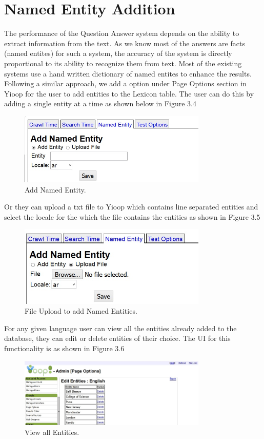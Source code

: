 \section{Named Entity Addition}
The performance of the Question Answer system depends on the ability to extract information from the text. As we know most of the answers are facts (named entites) for such a system, the accuracy of the system is directly proportional to its ability to recognize them from text. Most of the existing systems use a hand written dictionary of named entites to enhance the results. Following a similar approach, we add a option under Page Options section in Yioop for the user to add entities to the Lexicon table. The user can do this by adding a single entity at a time as shown below in Figure 3.4

\begin{figure}[htb]
\centering
\includegraphics[width=0.8\textwidth]{images/named_entity_manual.jpg}
\caption{Add Named Entity.} 
\label{fig:named_entity_manual}
\end{figure}

Or they can upload a txt file to Yioop which contains line separated entities and select the locale for the which the file contains the entities as shown in Figure 3.5

\begin{figure}[htb]
\centering
\includegraphics[width=0.8\textwidth]{images/named_entity_file.jpg}
\caption{File Upload to add Named Entities.} 
\label{fig:named_entity_file}
\end{figure}

For any given language user can view all the entities already added to the database, they can edit or delete entities of their choice. The UI for this functionality is as shown in Figure 3.6

\begin{figure}[htb]
\centering
\includegraphics[width=0.8\textwidth]{images/viewallentities.jpg}
\caption{View all Entities.} 
\label{fig:viewallentities}
\end{figure}
